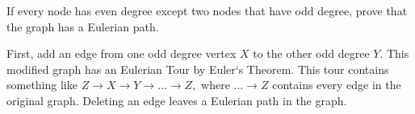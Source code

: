\question If every node has even degree except two nodes that 
have odd degree, prove that the graph has a Eulerian path.

\begin{solution}[.75 in]
First, add an edge from one odd degree vertex $X$ to the other 
odd degree $Y$. This modified graph has an Eulerian Tour by Euler`s 
Theorem. This tour contains something like $Z \rightarrow X \rightarrow 
Y \rightarrow \dotsc \rightarrow Z,$ where $\dotsc \rightarrow Z$ 
contains every edge in the original graph. Deleting an edge leaves a 
Eulerian path in the graph. 
\end{solution}

